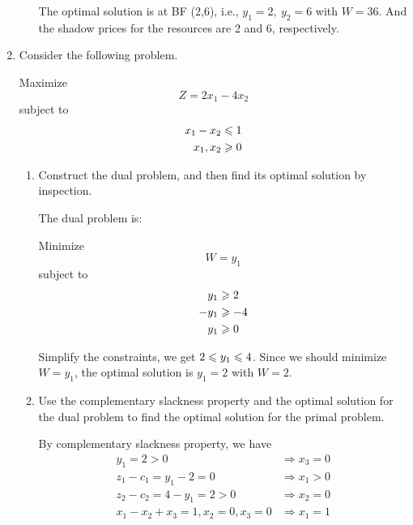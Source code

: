 \documentclass[a4paper]{article}
\begin{document}
\begin{enumerate}
\begin{enumerate}
\begin{solution}
	The optimal solution is at BF (2,6), i.e., $y_1=2,\ y_2=6$ with $W=36$. And the shadow prices for the resources are 2 and 6, respectively.
	\end{solution}
	
\end{enumerate}

\item Consider the following problem.

Maximize $$Z=2x_1-4x_2$$
subject to
\begin{equation*}
\begin{aligned}
x_1-x_2&\leqslant 1\\
x_1,x_2&\geqslant 0\\
\end{aligned}
\end{equation*}
\begin{enumerate}
	\item Construct the dual problem, and then find its optimal solution by inspection.
	
	\begin{solution}
		The dual problem is:
		
		Minimize $$W=y_1$$
		subject to
		\begin{equation*}
		\begin{aligned}
		y_1&\geqslant 2\\
		-y_1&\geqslant -4\\
		y_1&\geqslant 0\\
		\end{aligned}
		\end{equation*}
		
		Simplify the constraints, we get $2\leqslant y_1\leqslant 4$. Since we should minimize $W=y_1$, the optimal solution is $y_1=2$ with $W=2$.
		
	\end{solution}
	
	\item Use the complementary slackness property and the optimal solution for the dual problem to find the optimal solution for the primal problem.
	
	\begin{solution}
		
		By complementary slackness property, we have
		\begin{equation*}
		\begin{aligned}
		y_1=2>0&\Rightarrow x_3=0\\
		z_1-c_1=y_1-2=0&\Rightarrow x_1>0\\
		z_2-c_2=4-y_1=2>0&\Rightarrow x_2=0\\
		x_1-x_2+x_3=1, x_2=0,x_3=0&\Rightarrow x_1=1\\
		\end{aligned}
		\end{equation*}
		

\end{solution}
\end{enumerate}
\end{enumerate}
\end{document}
